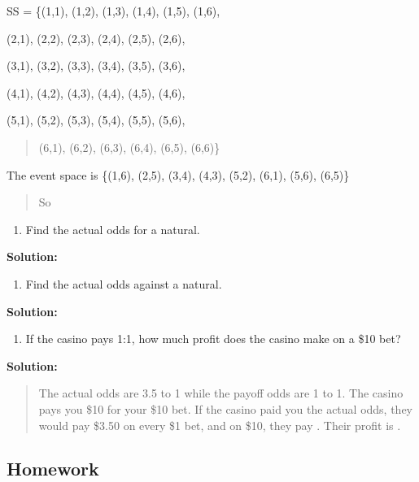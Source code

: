 \documentclass[]{book}
\providecommand{\tightlist}{%
  \setlength{\itemsep}{0pt}\setlength{\parskip}{0pt}}
\begin{document}
SS = \{(1,1), (1,2), (1,3), (1,4), (1,5), (1,6),

(2,1), (2,2), (2,3), (2,4), (2,5), (2,6),

(3,1), (3,2), (3,3), (3,4), (3,5), (3,6),

(4,1), (4,2), (4,3), (4,4), (4,5), (4,6),

(5,1), (5,2), (5,3), (5,4), (5,5), (5,6),

\begin{quote}
(6,1), (6,2), (6,3), (6,4), (6,5), (6,6)\}
\end{quote}

The event space is \{(1,6), (2,5), (3,4), (4,3), (5,2), (6,1), (5,6),
(6,5)\}

\begin{quote}
So
\end{quote}

\begin{enumerate}
\def\labelenumi{\alph{enumi}.}
\setcounter{enumi}{1}
\tightlist
\item
  Find the actual odds for a natural.
\end{enumerate}

\textbf{Solution:}

\begin{enumerate}
\def\labelenumi{\alph{enumi}.}
\setcounter{enumi}{2}
\tightlist
\item
  Find the actual odds against a natural.
\end{enumerate}

\textbf{Solution:}

\begin{enumerate}
\def\labelenumi{\alph{enumi}.}
\setcounter{enumi}{3}
\tightlist
\item
  If the casino pays 1:1, how much profit does the casino make on a
  \$10 bet?
\end{enumerate}

\textbf{Solution:}

\begin{quote}
The actual odds are 3.5 to 1 while the payoff odds are 1 to 1. The
casino pays you \$10 for your \$10 bet. If the casino paid you the
actual odds, they would pay \$3.50 on every \$1 bet, and on \$10, they
pay . Their profit is .
\end{quote}

\hypertarget{homework-11}{%
\subsection{Homework}\label{homework-11}}
\end{document}
